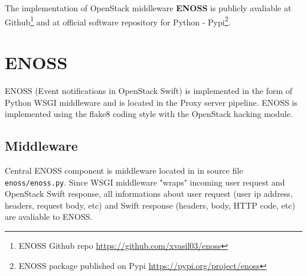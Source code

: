     The implementation of OpenStack middleware \textbf{ENOSS} is publicly avaliable at Github\footnote{ENOSS Github repo \url{https://github.com/xvasil03/enoss}} and at official software repository for Python - Pypi\footnote{ENOSS package published on Pypi \url{https://pypi.org/project/enoss}}.


\section{ENOSS}
    ENOSS (Event notifications in OpenStack Swift) is implemented in the form of Python WSGI middleware and is located in the Proxy server pipeline. ENOSS is implemented using the flake8 coding style with the OpenStack hacking module.

    \subsection{Middleware}\label{sec:enoss-swift-section}
    Central ENOSS component is middleware located in in source file \texttt{enoss/enoss.py}. Since WSGI middleware "wraps" incoming user request and OpenStack Swift response, all informations about user request (user ip address, headers, request body, etc) and Swift response (headers, body, HTTP code, etc) are avaliable to ENOSS.

